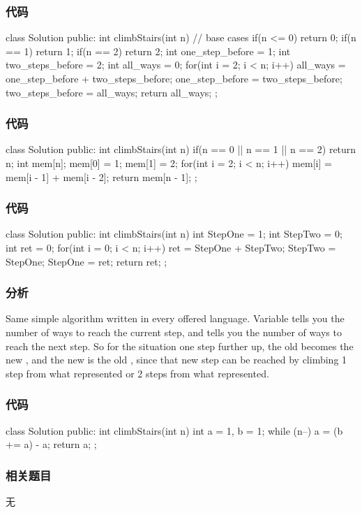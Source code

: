 \subsubsection{代码}
\begin{Code}
class Solution {
public:
    int climbStairs(int n) {
        // base cases
        if(n <= 0) return 0;
        if(n == 1) return 1;
        if(n == 2) return 2;
        int one_step_before = 1;
        int two_steps_before = 2;
        int all_ways = 0;
        for(int i = 2; i < n; i++) {
            all_ways = one_step_before + two_steps_before;
            one_step_before = two_steps_before;
            two_steps_before = all_ways;
        }
        return all_ways;
    }
};
\end{Code}


\subsubsection{代码}
\begin{Code}
class Solution {
public:
    int climbStairs(int n) {
        if(n == 0 || n == 1 || n == 2) {
            return n;
        }
        int mem[n];
        mem[0] = 1;
        mem[1] = 2;
        for(int i = 2; i < n; i++) {
            mem[i] = mem[i - 1] + mem[i - 2];
        }
        return mem[n - 1];
    }
};
\end{Code}

\subsubsection{代码}
\begin{Code}
class Solution {
public:
    int climbStairs(int n) {
        int StepOne = 1;
        int StepTwo = 0;
        int ret = 0;
        for(int i = 0; i < n; i++) {
            ret = StepOne + StepTwo;
            StepTwo = StepOne;
            StepOne = ret;
        }
        return ret;
    }
};
\end{Code}

\subsubsection{分析}
Same simple algorithm written in every offered language. Variable  tells you the number of ways to reach the current step, and  tells you the number of ways to reach the next step. So for the situation one step further up, the old  becomes the new , and the new  is the old , since that new step can be reached by climbing 1 step from what  represented or 2 steps from what  represented.

\subsubsection{代码}
\begin{Code}
class Solution {
public:
    int climbStairs(int n) {
        int a = 1, b = 1;
        while (n--)
            a = (b += a) - a;
        return a;
    }
};
\end{Code}

\subsubsection{相关题目}

\begindot
\item 无
\myenddot